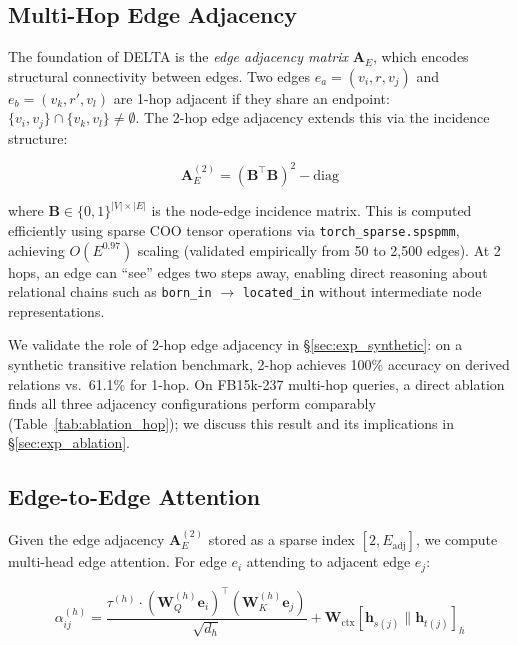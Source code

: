 \documentclass{article}
\begin{document}
\subsection{Multi-Hop Edge Adjacency}
\label{sec:edge_adj}

The foundation of DELTA is the \emph{edge adjacency matrix} $\mathbf{A}_E$, which encodes structural connectivity between edges. Two edges $e_a = (v_i, r, v_j)$ and $e_b = (v_k, r', v_l)$ are 1-hop adjacent if they share an endpoint: $\{v_i, v_j\} \cap \{v_k, v_l\} \neq \emptyset$. The 2-hop edge adjacency extends this via the incidence structure:

\begin{equation}
    \mathbf{A}_E^{(2)} = (\mathbf{B}^\top \mathbf{B})^2 - \text{diag}
\end{equation}

where $\mathbf{B} \in \{0,1\}^{|V| \times |E|}$ is the node-edge incidence matrix. This is computed efficiently using sparse COO tensor operations via \texttt{torch\_sparse.spspmm}, achieving $O(E^{0.97})$ scaling (validated empirically from 50 to 2,500 edges). At 2 hops, an edge can ``see'' edges two steps away, enabling direct reasoning about relational chains such as \texttt{born\_in} $\to$ \texttt{located\_in} without intermediate node representations.

We validate the role of 2-hop edge adjacency in \S\ref{sec:exp_synthetic}: on a synthetic transitive relation benchmark, 2-hop achieves 100\% accuracy on derived relations vs.\ 61.1\% for 1-hop. On FB15k-237 multi-hop queries, a direct ablation finds all three adjacency configurations perform comparably (Table~\ref{tab:ablation_hop}); we discuss this result and its implications in \S\ref{sec:exp_ablation}.

\subsection{Edge-to-Edge Attention}
\label{sec:edge_attn}

Given the edge adjacency $\mathbf{A}_E^{(2)}$ stored as a sparse index $[2, E_{\text{adj}}]$, we compute multi-head edge attention. For edge $e_i$ attending to adjacent edge $e_j$:

\begin{equation}
    \alpha_{ij}^{(h)} = \frac{\tau^{(h)} \cdot (\mathbf{W}_Q^{(h)} \mathbf{e}_i)^\top (\mathbf{W}_K^{(h)} \mathbf{e}_j)}{\sqrt{d_h}} + \mathbf{W}_{\text{ctx}}[\mathbf{h}_{s(j)} \| \mathbf{h}_{t(j)}]_h
    \label{eq:edge_attn}
\end{equation}
\end{document}
